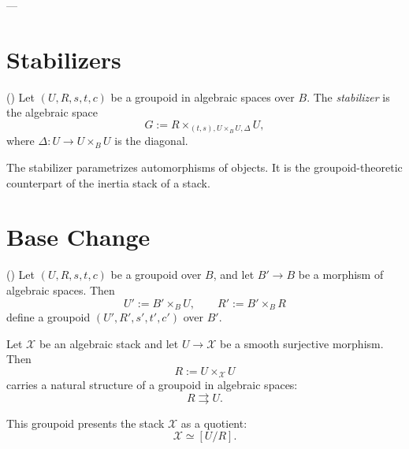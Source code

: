 ---

\section{Stabilizers}

\begin{definition}[Stabilizer]
	(\cite[][Tag 0448]{stacks-project})
	Let $(U,R,s,t,c)$ be a groupoid in algebraic spaces over $B$. The
	\emph{stabilizer} is the algebraic space
	\[
	G := R \times_{(t,s), U \times_B U, \Delta} U,
	\]
	where $\Delta : U \to U \times_B U$ is the diagonal.
\end{definition}

\begin{remark}
	The stabilizer parametrizes automorphisms of objects. It is the groupoid-theoretic
	counterpart of the inertia stack of a stack.
\end{remark}

\section{Base Change}

\begin{lemma}
	(\cite[][Tag 043V]{stacks-project})
	Let $(U,R,s,t,c)$ be a groupoid over $B$, and let $B' \to B$ be a morphism of
	algebraic spaces. Then
	\[
	U' := B' \times_B U, \qquad R' := B' \times_B R
	\]
	define a groupoid $(U',R',s',t',c')$ over $B'$.
\end{lemma}

\begin{remark}
	Let $\mathcal{X}$ be an algebraic stack and let $U \to \mathcal{X}$ be a smooth
	surjective morphism. Then
	\[
	R := U \times_{\mathcal{X}} U
	\]
	carries a natural structure of a groupoid in algebraic spaces:
	\[
	R \rightrightarrows U.
	\]
	
	This groupoid presents the stack $\mathcal{X}$ as a quotient:
	\[
	\mathcal{X} \simeq [U/R].
	\]
\end{remark}
